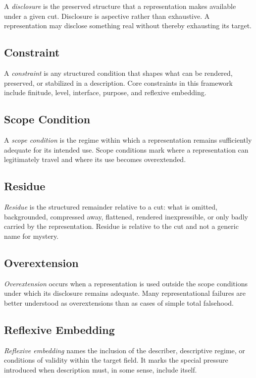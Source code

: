 \documentclass[11pt]{article}
\renewcommand{\emph}[1]{\textit{#1}}
\begin{document}
A \emph{disclosure} is the preserved structure that a representation makes available under a given cut. Disclosure is aspective rather than exhaustive. A representation may disclose something real without thereby exhausting its target.

\subsection*{Constraint}

A \emph{constraint} is any structured condition that shapes what can be rendered, preserved, or stabilized in a description. Core constraints in this framework include finitude, level, interface, purpose, and reflexive embedding.

\subsection*{Scope Condition}

A \emph{scope condition} is the regime within which a representation remains sufficiently adequate for its intended use. Scope conditions mark where a representation can legitimately travel and where its use becomes overextended.

\subsection*{Residue}

\emph{Residue} is the structured remainder relative to a cut: what is omitted, backgrounded, compressed away, flattened, rendered inexpressible, or only badly carried by the representation. Residue is relative to the cut and not a generic name for mystery.

\subsection*{Overextension}

\emph{Overextension} occurs when a representation is used outside the scope conditions under which its disclosure remains adequate. Many representational failures are better understood as overextensions than as cases of simple total falsehood.

\subsection*{Reflexive Embedding}

\emph{Reflexive embedding} names the inclusion of the describer, descriptive regime, or conditions of validity within the target field. It marks the special pressure introduced when description must, in some sense, include itself.
\end{document}
